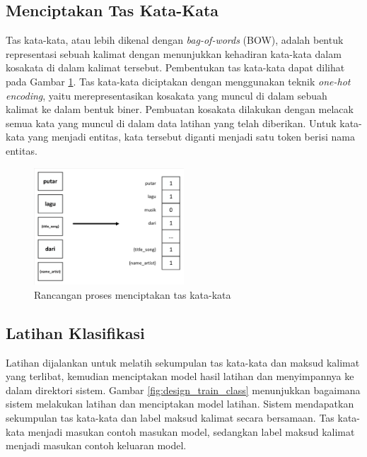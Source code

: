 \subsection{Menciptakan Tas Kata-Kata}

Tas kata-kata, atau lebih dikenal dengan \textit{bag-of-words} (BOW), adalah bentuk representasi sebuah kalimat dengan menunjukkan kehadiran kata-kata dalam kosakata di dalam kalimat tersebut. Pembentukan tas kata-kata dapat dilihat pada Gambar \ref{fig:design_bow}. Tas kata-kata diciptakan dengan menggunakan teknik \textit{one-hot encoding}, yaitu merepresentasikan kosakata yang muncul di dalam sebuah kalimat ke dalam bentuk biner. Pembuatan kosakata dilakukan dengan melacak semua kata yang muncul di dalam data latihan yang telah diberikan. Untuk kata-kata yang menjadi entitas, kata tersebut diganti menjadi satu token berisi nama entitas.

\begin{figure}[H]
	\centering
	\includegraphics[width=0.5\textwidth, trim=3 3 3 3, clip]{resources/4-design_bow.pdf}
	\caption{Rancangan proses menciptakan tas kata-kata}
	\label{fig:design_bow}
\end{figure}

\subsection{Latihan Klasifikasi}

Latihan dijalankan untuk melatih sekumpulan tas kata-kata dan maksud kalimat yang terlibat, kemudian menciptakan model hasil latihan dan menyimpannya ke dalam direktori sistem. Gambar \ref{fig:design_train_class} menunjukkan bagaimana sistem melakukan latihan dan menciptakan model latihan. Sistem mendapatkan sekumpulan tas kata-kata dan label maksud kalimat secara bersamaan. Tas kata-kata menjadi masukan contoh masukan model, sedangkan label maksud kalimat menjadi masukan contoh keluaran model.

